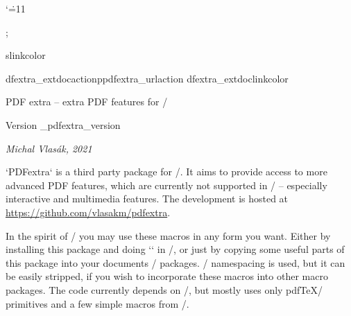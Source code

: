 \catcode`\.=11

\hyperlinks\Green\Green

\newcount\tnotenum
\def\tnotelist{}
\def\tnote#1{\incr\tnotenum $^{\rm\_romannumeral\tnotenum}$\global\addto\tnotelist{{#1}}}
\def\tnoteprint{\typoscale[920/920]\par \tnotenum=0
   \ea\foreach\tnotelist
     \do{\advance\tnotenum by1 \par $^{\rm\_romannumeral\tnotenum}$##1 }\par
   \global\tnotenum=0 \gdef\tnotelist{}%
}

\protected{}
\protected{}
\protected{}
\public \link \ilink \ulink ;

\let\_cslinkcolor\Blue

\let\_pdfextra_extdocaction\_pdfextra_urlaction
\let\_pdfextra_extdoclinkcolor\Blue
\def\_Xindex#1#2{\sdef{,#1}{}\slet{el:#1}{optexdoclink}}
\def\optexdoclink{\hlink[extdoc:\optexdocurl\#cs:\_tmpa]{\csstring\\\_tmpb}}
\def\optexdocurl{http://petr.olsak.net/ftp/olsak/optex/optex-doc.pdf}
\iftrue \fi

\def\Xeref#1{\sdef{,#1}{}\slet{el:#1}{texdoclink}}
\def\texdoclink{\hlink[extdoc:\texdocurl\#cs:\_tmpa]{\csstring\\\_tmpb}}
\def\texdocurl{http://petr.olsak.net/ftp/olsak/optex/tex-nutshell.pdf}
\iftrue \fi


\tit PDF extra -- extra PDF features for \OpTeX/

\hfill Version \_pdfextra_version

\centerline{\it Michal Vlasák, 2021}
\bigskip

\noindent
`PDFextra` is a third party package for \OpTeX/. It aims to provide access to
more advanced PDF features, which are currently not supported in \OpTeX/ --
especially interactive and multimedia features. The development is hosted at
\url{https://github.com/vlasakm/pdfextra}.

In the spirit of \OpTeX/ you may use these macros in any form you want. Either
by installing this package and doing `\load[pdfextra]` in \OpTeX/, or just by
copying some useful parts of this package into your documents / packages.
\OpTeX/ namespacing is used, but it can be easily stripped, if you wish to
incorporate these macros into other macro packages. The code currently depends
on \LuaTeX/, but mostly uses only pdf\TeX/ primitives and a few simple macros
from \OpTeX/.

